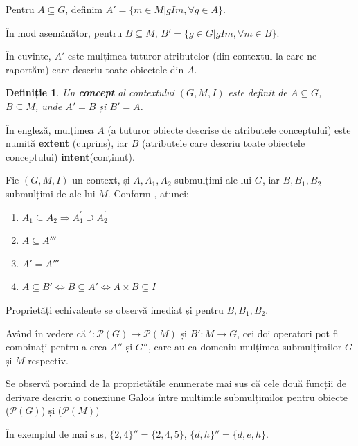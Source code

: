\documentclass[12pt, a4paper, twoside, romanian]{teza-upb}
\newtheorem{defn}{Definiție}
\begin{document}
    Pentru $A \subseteq G$, definim
    $ A' = \{m \in M | gIm, \forall g \in A\} $.

    În mod asemănător, pentru $B \subseteq M$, $B' = \{g \in G | gIm, \forall m \in B \}$.

    În cuvinte, $A'$ este mulțimea tuturor atributelor (din contextul la care ne raportăm) care descriu toate obiectele din $A$.

    \begin{defn}
      Un \textbf{concept} al contextului $(G, M, I)$ este definit de $A \subseteq G$, $B \subseteq M$, unde $A' = B$ și $B' = A$.
    \end{defn}

    În engleză, mulțimea $A$ (a tuturor obiecte descrise de atributele conceptului) este numită \textbf{extent} (cuprins), iar $B$ (atributele care descriu toate obiectele conceptului) \textbf{intent}(conținut).


Fie $(G, M, I)$ un context, și $A, A_1, A_2$ submulțimi ale lui $G$, iar $B, B_1, B_2$ submulțimi de-ale lui $M$. Conform \cite{Ganter:1997:FCA:550737}, atunci:

    \begin{enumerate}
        \item $A_1 \subseteq A_2 \Rightarrow A^{'}_{1} \supseteq A^{'}_2$
        \item $A  \subseteq A'''$
        \item $A' = A'''$
        \item $A \subseteq B' \Longleftrightarrow B \subseteq A' \Longleftrightarrow A \times B \subseteq I$
    \end{enumerate}

    Proprietăți echivalente se observă imediat și pentru $B, B_1, B_2$.

    Având în vedere că $ ': \mathcal P \left(G \right) \rightarrow \mathcal P \left(M\right)$ și $B' : M \rightarrow G$, cei doi operatori pot fi combinați pentru a crea $A''$ și $G''$, care au ca domeniu mulțimea submulțimilor $G$ și $M$ respectiv. 

Se observă pornind de la proprietățile enumerate mai sus că cele două funcții de derivare descriu o conexiune Galois între mulțimile submulțimilor pentru obiecte ($\mathcal P \left(G \right)$) și ($\mathcal P \left( M \right) $)

În exemplul de mai sus, $\{2, 4\}'' = \{2, 4, 5\}$, $\{d, h\}'' = \{d, e, h \}$.
\end{document}
